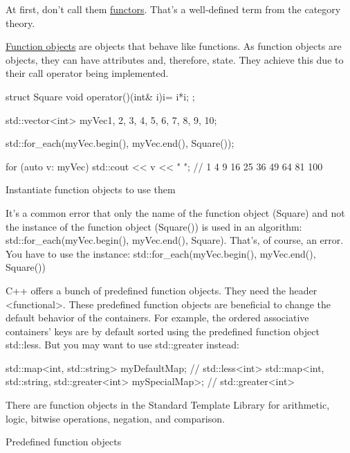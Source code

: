 At first, don’t call them \href{https://en.wikipedia.org/wiki/Functor}{functors}. That’s a well-defined term from the category theory.

\href{http://en.cppreference.com/w/cpp/utility/functional}{Function objects} are objects that behave like functions. As function objects are objects, they can have attributes and, therefore, state. They achieve this due to their call operator being implemented.

\begin{cpp}
struct Square{
	void operator()(int& i){i= i*i;}
};

std::vector<int> myVec{1, 2, 3, 4, 5, 6, 7, 8, 9, 10};

std::for_each(myVec.begin(), myVec.end(), Square());

for (auto v: myVec) std::cout << v << " "; // 1 4 9 16 25 36 49 64 81 100
\end{cpp}

\begin{myTip}{Instantiate function objects to use them}
	
It’s a common error that only the name of the function object (Square) and not the instance of the function object (Square()) is used in an algorithm: std::for\_each(myVec.begin(), myVec.end(), Square). That’s, of course, an error. You have to use the instance: std::for\_each(myVec.begin(), myVec.end(), Square())
\end{myTip}


C++ offers a bunch of predefined function objects. They need the header <functional>. These predefined function objects are beneficial to change the default behavior of the containers. For example, the ordered associative containers’ keys are by default sorted using the predefined function object std::less. But you may want to use std::greater instead:

\begin{cpp}
std::map<int, std::string> myDefaultMap; // std::less<int>
std::map<int, std::string, std::greater<int> mySpecialMap>; // std::greater<int>
\end{cpp}

There are function objects in the Standard Template Library for arithmetic, logic, bitwise operations, negation, and comparison.

\begin{center}
Predefined function objects
\end{center}

